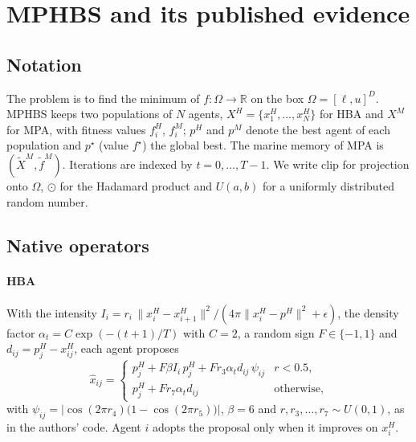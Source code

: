 \documentclass[11pt]{article}
\theoremstyle{definition}
\theoremstyle{remark}
\begin{document}
\section{MPHBS and its published evidence}
\label{sec:mphbs}

\subsection{Notation}
The problem is to find the minimum of $f:\Omega\to\mathbb{R}$ on the box $\Omega=[\ell,u]^D$. MPHBS keeps two
populations of $N$ agents, $X^H=\{x^H_1,\dots,x^H_N\}$ for HBA and $X^M$ for MPA, with fitness values $f^H_i$, $f^M_i$;
$p^H$ and $p^M$ denote the best agent of each population and $p^\star$ (value $f^\star$) the global best. The marine
memory of MPA is $(\tilde X^M, \tilde f^M)$. Iterations are indexed by $t=0,\dots,T-1$. We write $\mathrm{clip}$ for
projection onto $\Omega$, $\odot$ for the Hadamard product and $U(a,b)$ for a uniformly distributed random number.

\subsection{Native operators}
\paragraph{HBA} With the intensity
$I_i = r_i\,\|x^H_i - x^H_{i+1}\|^2 / (4\pi\|x^H_i - p^H\|^2 + \epsilon)$, the density factor
$\alpha_t = C\exp(-(t+1)/T)$ with $C=2$, a random sign $F\in\{-1,1\}$ and $d_{ij}=p^H_j-x^H_{ij}$, each agent proposes
\begin{equation}
\hat x_{ij} = \begin{cases}
p^H_j + F\beta I_i\,p^H_j + F r_3\alpha_t d_{ij}\,\psi_{ij} & r<0.5,\\
p^H_j + F r_7\alpha_t d_{ij} & \text{otherwise},
\end{cases}
\label{eq:hba}
\end{equation}
with $\psi_{ij}=\bigl|\cos(2\pi r_4)\bigl(1-\cos(2\pi r_5)\bigr)\bigr|$, $\beta=6$ and
$r,r_3,\dots,r_7\sim U(0,1)$, as in the authors' code. Agent $i$ adopts the proposal only when it improves on
$x^H_i$.
\end{document}
